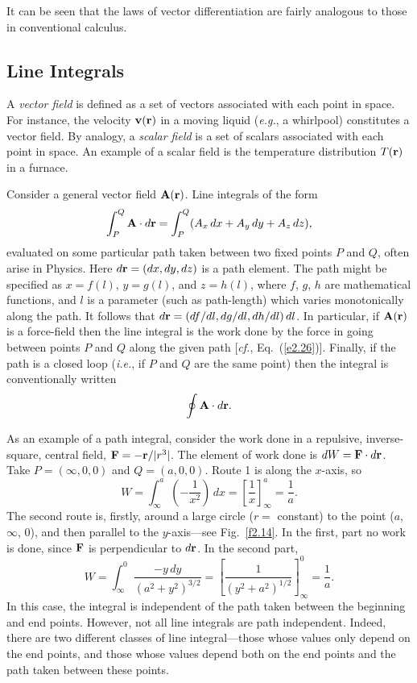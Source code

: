 It can be seen that the laws of vector differentiation are fairly analogous to those in 
conventional calculus.

\subsection{Line Integrals}
A {\em vector field}\/ is defined as a set of vectors associated with each point in space.
For instance, the velocity ${\bf v}({\bf r})$ in a moving liquid 
({\em e.g.}, a whirlpool) constitutes
a vector field. By analogy, a {\em scalar field} is a set of scalars associated with each
point in space. An example of a scalar field is the temperature distribution $T({\bf r})$ in
a furnace. 

Consider a general vector field ${\bf A}({\bf r})$. Line integrals of the form
\begin{equation}
\int_P^Q {\bf A}\cdot d{\bf r} = \int_P^Q (A_x\,dx+A_y\,dy + A_z\,dz),
\end{equation}
evaluated on some particular path taken between two fixed points $P$ and $Q$,
often arise in Physics. Here $d{\bf r} = (dx,dy,dz)$ is
a path element. The path
might be specified as $x=f(l)$, $y=g(l)$, and $z=h(l)$, where
$f$, $g$, $h$ are mathematical functions, and $l$ is a parameter (such as path-length) which varies monotonically
along the path.  It follows that $d{\bf r} = (df/dl, dg/dl, dh/dl)\,dl$.
In particular, if ${\bf A}({\bf r})$ is a force-field then the line integral is the work done by the force in going between points
$P$ and $Q$ along the given path [{\em cf.}, Eq.~(\ref{e2.26})]. 
Finally, if the path is a closed loop ({\em i.e.}, if $P$ and $Q$ are the same point) then the integral is conventionally written
\begin{equation}
\oint {\bf A}\cdot d{\bf r}.
\end{equation}

As an example of a path integral, consider the work done in a repulsive, inverse-square, 
central field, ${\bf F} = - {\bf r}/ |r^3|$. The 
element of work done  is $dW={\bf F}\cdot d{\bf r}$. 
Take $P=(\infty, 0, 0)$ and $Q=(a,0,0)$. Route 1 is along the $x$-axis, so 
\begin{equation}
W = \int_{\infty}^a \left(-\frac{1}{x^2}\right)\,dx = \left[\frac{1}{x}\right]_{\infty}^a
=\frac{1}{a}.
\end{equation}
The second route is, firstly, around a large circle ($r=$ constant) to the point
($a$, $\infty$, 0), and then parallel to the $y$-axis---see Fig.~\ref{f2.14}. In the first, part no work is 
done,
since ${\bf F}$ is perpendicular to $d{\bf r}$. In the second part,
\begin{equation}
W = \int_{\infty}^0 \frac{-y\,dy}{(a^2 + y^2)^{3/2}} = \left[\frac{1}{(y^2+a^2)^{1/2}}
\right]^0_\infty = \frac{1}{a}.
\end{equation}
In this case, the integral is independent of the path taken between the beginning and end points. However, not all line integrals
are path independent. Indeed, there are two different classes of
line integral---those whose values  only depend on the end points, and
those whose values depend both on  the end points and the path taken
between these points.

